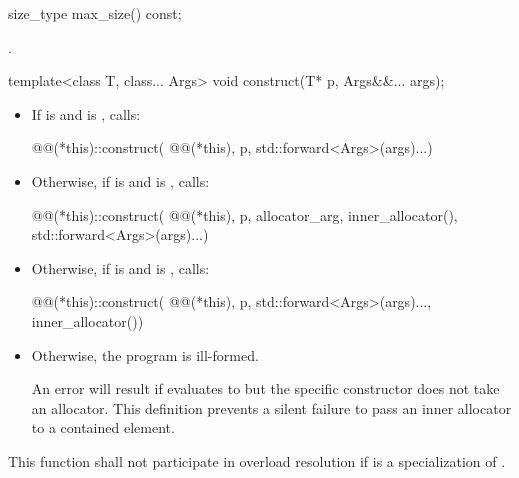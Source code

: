%
\begin{itemdecl}
size_type max_size() const;
\end{itemdecl}

\begin{itemdescr}
\pnum
\returns {}.
\end{itemdescr}

%
\begin{itemdecl}
template<class T, class... Args>
  void construct(T* p, Args&&... args);
\end{itemdecl}

\begin{itemdescr}
\pnum
\effects
\begin{itemize}
\item If  is  and
 is , calls:
\begin{codeblock}
@@(*this)::construct(
    @@(*this), p, std::forward<Args>(args)...)
\end{codeblock}

\item Otherwise, if  is  and
 is , calls:
\begin{codeblock}
@@(*this)::construct(
    @@(*this), p, allocator_arg, inner_allocator(), std::forward<Args>(args)...)
\end{codeblock}

\item Otherwise, if  is  and
 is , calls:
\begin{codeblock}
@@(*this)::construct(
    @@(*this), p, std::forward<Args>(args)..., inner_allocator())
\end{codeblock}

\item Otherwise, the program is ill-formed.
\begin{note}
An error will result if
 evaluates to  but the specific constructor does not take an
allocator. This definition prevents a silent failure to pass an inner allocator to a
contained element.
\end{note}
\end{itemize}

\pnum
\remarks
This function shall not participate in overload resolution if
 is a specialization of .
\end{itemdescr}

